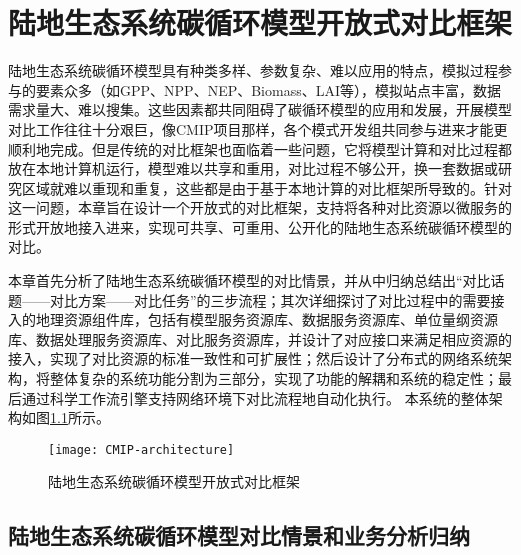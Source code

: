 \chapter{陆地生态系统碳循环模型开放式对比框架}
\label{chap:arch}

陆地生态系统碳循环模型具有种类多样、参数复杂、难以应用的特点，模拟过程参与的要素众多（如GPP、NPP、NEP、Biomass、LAI等），模拟站点丰富，数据需求量大、难以搜集。这些因素都共同阻碍了碳循环模型的应用和发展，开展模型对比工作往往十分艰巨，像CMIP项目那样，各个模式开发组共同参与进来才能更顺利地完成。但是传统的对比框架也面临着一些问题，它将模型计算和对比过程都放在本地计算机运行，模型难以共享和重用，对比过程不够公开，换一套数据或研究区域就难以重现和重复，这些都是由于基于本地计算的对比框架所导致的。针对这一问题，本章旨在设计一个开放式的对比框架，支持将各种对比资源以微服务的形式开放地接入进来，实现可共享、可重用、公开化的陆地生态系统碳循环模型的对比。

本章首先分析了陆地生态系统碳循环模型的对比情景，并从中归纳总结出“对比话题——对比方案——对比任务”的三步流程；其次详细探讨了对比过程中的需要接入的地理资源组件库，包括有模型服务资源库、数据服务资源库、单位量纲资源库、数据处理服务资源库、对比服务资源库，并设计了对应接口来满足相应资源的接入，实现了对比资源的标准一致性和可扩展性；然后设计了分布式的网络系统架构，将整体复杂的系统功能分割为三部分，实现了功能的解耦和系统的稳定性；最后通过科学工作流引擎支持网络环境下对比流程地自动化执行。
本系统的整体架构如图\ref{fig:CMIP-architecture}所示。

\begin{figure}[!htbp]
    \centering
    \texttt{[image: CMIP-architecture]}
    \caption{陆地生态系统碳循环模型开放式对比框架}
    \label{fig:CMIP-architecture}
\end{figure}

\section{陆地生态系统碳循环模型对比情景和业务分析归纳}

